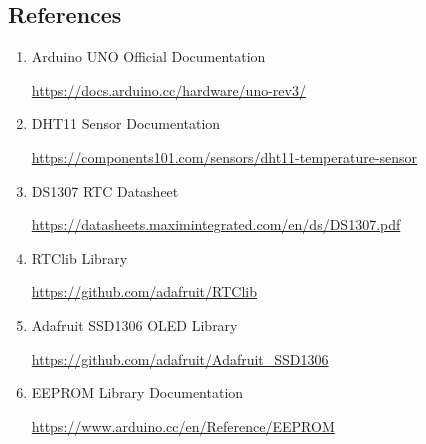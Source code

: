 \clearpage
\subsection{References}

\begin{enumerate}

\item Arduino UNO Official Documentation

\url{https://docs.arduino.cc/hardware/uno-rev3/}

\item DHT11 Sensor Documentation

\url{https://components101.com/sensors/dht11-temperature-sensor}

\item DS1307 RTC Datasheet

\url{https://datasheets.maximintegrated.com/en/ds/DS1307.pdf}

\item RTClib Library

\url{https://github.com/adafruit/RTClib}

\item Adafruit SSD1306 OLED Library

\url{https://github.com/adafruit/Adafruit_SSD1306}

\item EEPROM Library Documentation

\url{https://www.arduino.cc/en/Reference/EEPROM}

\end{enumerate}


\clearpage